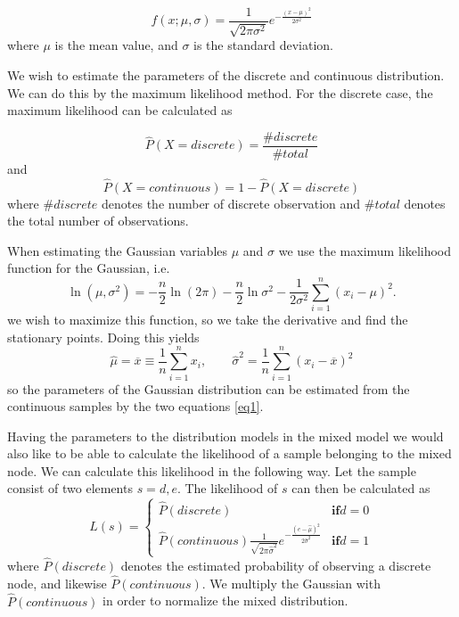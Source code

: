 \documentclass[10pt, journal, compsocconf,a4paper]{IEEEtran}
\begin{document}
\begin{equation}
f(x;\mu,\sigma) = \frac{1}{\sqrt{2\pi\sigma^2}} e^{ -\frac{(x-\mu)^2}{2\sigma^2} }  
\end{equation}
where $\mu$ is the mean value, and $\sigma$ is the standard deviation.

We wish to estimate the parameters of the discrete and continuous distribution. We can do this by the maximum likelihood method. For the discrete case, the maximum likelihood can be calculated as

\begin{equation}
  \hat{P}(X = discrete) = \frac{\#discrete}{\#total}
  \label{eq3} 
\end{equation}
and
\begin{equation}
  \hat{P}(X = continuous) = 1 - \hat{P}(X = discrete)
\end{equation}
where $\#discrete$ denotes the number of discrete observation and $\#total$ denotes the total number of observations.


When estimating the Gaussian variables $\mu$ and $\sigma$ we use the maximum likelihood function for the Gaussian, i.e.
\begin{equation}
  \ln(\mu, \sigma^2) = -\frac{n}{2}\ln(2\pi) - \frac{n}{2}\ln\sigma^2 - \frac{1}{2\sigma^2}\sum_{i=1}^n (x_i-\mu)^2.
\end{equation}
we wish to maximize this function, so we take the derivative and find the stationary points. Doing this yields
\begin{equation}
  \hat{\mu} = \overline{x} \equiv \frac{1}{n}\sum_{i=1}^n x_i, \qquad \hat{\sigma}^2 = \frac{1}{n} \sum_{i=1}^n (x_i - \overline{x})^2
  \label{eq1}
\end{equation}
so the parameters of the Gaussian distribution can be estimated from the continuous samples by the two equations \ref{eq1}. 


Having the parameters to the distribution models in the mixed model we would also like to be able to calculate the likelihood of a sample belonging to the mixed node. We can calculate this likelihood in the following way. Let the sample consist of two elements $s = {d, e}$. The likelihood of $s$ can then be calculated as
\begin{equation} 
L(s) = 
\left\{
\begin{array}{ll} 
  \hat{P}(discrete) & \mathbf{if } d = 0  \\
  \hat{P}(continuous) \frac{1}{\sqrt{2\pi\hat{\sigma}^2}} e^{ -\frac{(e-\hat{\mu})^2}{2\hat{\sigma}^2} }  & \mathbf{if } d = 1    
  \label{eq6}
\end{array} 
\right. 
\end{equation} 
where $\hat{P}(discrete)$ denotes the estimated probability of observing a discrete node, and likewise $\hat{P}(continuous)$. We multiply the Gaussian with $\hat{P}(continuous)$ in order to normalize the mixed distribution.
\end{document}
